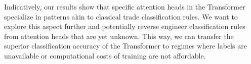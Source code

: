 Indicatively, our results show that specific attention heads in the Transformer specialize in patterns akin to classical trade classification rules. We want to explore this aspect further and potentially reverse engineer classification rules from attention heads that are yet unknown. This way, we can transfer the superior classification accuracy of the Transformer to regimes where labels are unavailable or computational costs of training are not affordable.